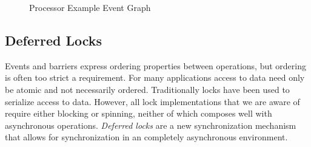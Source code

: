 \begin{figure}
\centering
{}
\vspace{-2mm}
\caption{Processor Example Event Graph\label{fig:procevents}}
\vspace{-4mm}
\end{figure}

\subsection{Deferred Locks}
\label{subsec:locks}

Events and barriers express ordering properties between operations, but 
ordering is often too strict a requirement.  For many applications access to data need only be atomic and
not necessarily ordered.  Traditionally locks have been used to serialize access to
data.  However, all lock implementations that we are aware of require either blocking
or spinning, neither of which composes well with asynchronous operations.
{\em Deferred locks} are a new synchronization mechanism that allows for synchronization
in an completely asynchronous environment.  

